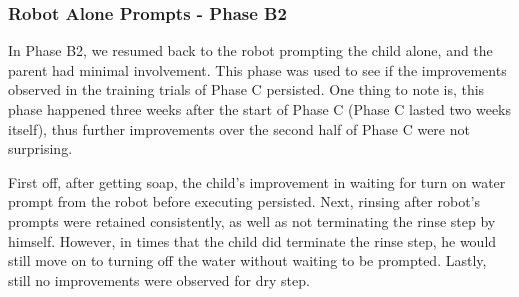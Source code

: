\documentclass{ut-thesis}
\begin{document}
\subsubsection{Robot Alone Prompts - Phase B2}
In Phase B2, we resumed back to the robot prompting the child alone, and the parent had minimal involvement.  This phase was used to see if the improvements observed in the training trials of Phase C persisted.  One thing to note is, this phase happened three weeks after the start of Phase C (Phase C lasted two weeks itself), thus further improvements over the second half of Phase C were not surprising.

First off, after getting soap, the child's improvement in waiting for turn on water prompt from the robot before executing persisted.  Next, rinsing after robot's prompts were retained consistently, as well as not terminating the rinse step by himself.  However, in times that the child did terminate the rinse step, he would still move on to turning off the water without waiting to be prompted.  Lastly, still no improvements were observed for dry step.
\end{document}
